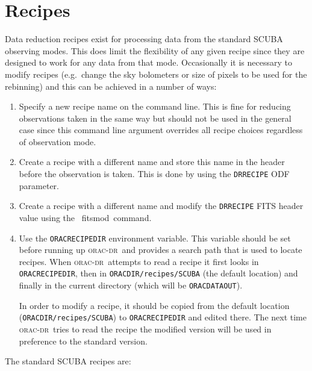 \documentclass[twoside,11pt]{article}
\newcommand{\xref}[3]{#1}
\newcommand{\xlabel}[1]{}
\renewcommand{\_}{\texttt{\symbol{95}}}
\newcommand{\oracdr}{\xref{\textsc{orac-dr}}{sun230}{}}
\newcommand{\task}[1]{{\textsf{#1}}}
\newcommand{\Kappa}{\xref{{\sc{Kappa}}}{sun95}{}}
\newcommand{\fitsmod}{\xref{\task{fitsmod}}{sun95}{FITSMOD}}
\begin{document}
\section{Recipes\xlabel{recipes}}

Data reduction recipes exist for processing data from the standard SCUBA
observing modes. This does limit the flexibility of any given recipe since
they are designed to work for any data from that mode. Occasionally it is
necessary to modify recipes (e.g.\ change the sky bolometers or size of pixels to
be used for the rebinning) and this can be achieved in a number of ways:

\begin{enumerate}

\item Specify a new recipe name on the command line. This is fine
for reducing observations taken in the same way but should not be used
in the general case since this command line argument overrides all
recipe choices regardless of observation mode.

\item Create a recipe with a different name and store this name
in the header before the observation is taken. This is done by using
the \texttt{DRRECIPE} ODF parameter.

\item Create a recipe with a different name and modify the \texttt{DRRECIPE}
FITS header value using the \Kappa\ \fitsmod\ command.


\item Use the \texttt{ORAC\_RECIPE\_DIR} environment variable. This variable
should be set before running up \oracdr\ and provides a search path that is
used to locate recipes. When \oracdr\ attempts to read a recipe it first looks
in \texttt{ORAC\_RECIPE\_DIR}, then in \texttt{ORAC\_DIR/recipes/SCUBA} (the
default location) and finally in the current directory (which will be
\texttt{ORAC\_DATA\_OUT}).

In order to modify a recipe, it should be copied from the default location
(\texttt{ORAC\_DIR/recipes/SCUBA}) to \texttt{ORAC\_RECIPE\_DIR} and edited there. The next
time \oracdr\ tries to read the recipe the modified version will be used
in preference to the standard version.

\end{enumerate}

The standard SCUBA recipes are:
\end{document}

